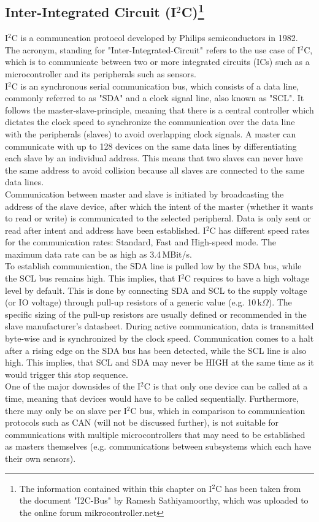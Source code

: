 \documentclass[fontsize=11pt,%
twoside,%
BCOR          = 8mm, %
DIV           = 11,  %
titlepage     = off,%
index=totoc,%
xcolor        = pdftex,%
dvipsnames,%
bibliography  = totoc,%
bibliography = numbered, %
listof        = notnumbered]{scrreprt}
\begin{document}
\subsection{Inter-Integrated Circuit (I$^2$C)\footnote{The information contained within this chapter on I$^2$C has been taken from the document "I2C-Bus" by Ramesh Sathiyamoorthy\cite{I2C}, which was uploaded to the online forum mikrocontroller.net}}
I$^2$C is a communcation protocol developed by Philips semiconductors in 1982. The acronym, standing for "Inter-Integrated-Circuit" refers to the use case of I$^2$C, which is to communicate between two or more integrated circuits (ICs) such as a microcontroller and its peripherals such as sensors.\\
I$^2$C is an synchronous serial communication bus, which consists of a data line, commonly referred to as "SDA" and a clock signal line, also known as "SCL". It follows the master-slave-principle, meaning that there is a central controller which dictates the clock speed to synchronize the communication over the data line with the peripherals (slaves) to avoid overlapping clock signals. A master can communicate with up to 128 devices on the same data lines by differentiating each slave by an individual address. This means that two slaves can never have the same address to avoid collision because all slaves are connected to the same data lines.\\
Communication between master and slave is initiated by broadcasting the address of the slave device, after which the intent of the master (whether it wants to read or write) is communicated to the selected peripheral. Data is only sent or read after intent and address have been established. I$^2$C has different speed rates for the communication rates: Standard, Fast and High-speed mode. The maximum data rate can be as high as 3.4\,MBit/s.\\
To establish communication, the SDA line is pulled low by the SDA bus, while the SCL bus remains high. This implies, that I$^2$C requires to have a high voltage level by default. This is done by connecting SDA and SCL to the supply voltage (or IO voltage) through pull-up resistors of a generic value (e.g. 10\,k$\Omega$). The specific sizing of the pull-up resistors are usually defined or recommended in the slave manufacturer's datasheet. During active communication, data is transmitted byte-wise and is synchronized by the clock speed. Communication comes to a halt after a rising edge on the SDA bus has been detected, while the SCL line is also high. This implies, that SCL and SDA may never be HIGH at the same time as it would trigger this stop sequence.\\
One of the major downsides of the I$^2$C is that only one device can be called at a time, meaning that devices would have to be called sequentially. Furthermore, there may only be on slave per I$^2$C bus, which in comparison to communication protocols such as CAN (will not be discussed further), is not suitable for communications with multiple microcontrollers that may need to be established as masters themselves (e.g. communications between subsystems which each have their own sensors).
\end{document}
